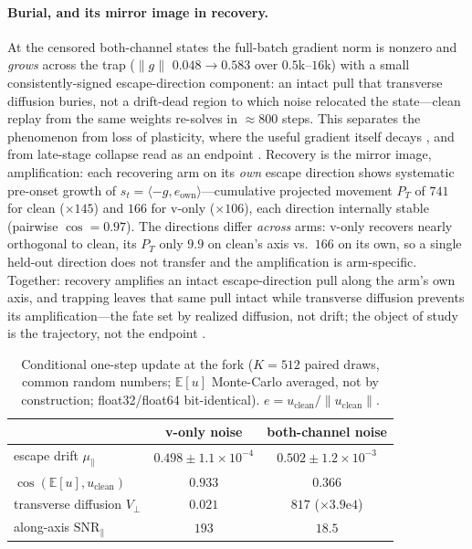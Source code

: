 \paragraph{Burial, and its mirror image in recovery.}
At the censored both-channel states the full-batch gradient norm is nonzero and
\emph{grows} across the trap ($\|g\|$ $0.048\!\to\!0.583$ over $0.5$k--$16$k) with
a small consistently-signed escape-direction component: an intact pull that
transverse diffusion buries, not a drift-dead region to which noise relocated the
state---clean replay from the same weights re-solves in ${\approx}800$ steps. This
separates the phenomenon from loss of plasticity, where the useful gradient itself
decays \citep{dohare}, and from late-stage collapse read as an endpoint
\citep{antigrok}. Recovery is the mirror image, amplification: each recovering arm
on its \emph{own} escape direction shows systematic pre-onset growth of
$s_t=\langle-g,e_{\mathrm{own}}\rangle$---cumulative projected movement $P_T$ of
$741$ for clean ($\times145$) and $166$ for v-only ($\times106$), each direction
internally stable (pairwise $\cos=0.97$). The directions differ \emph{across} arms:
v-only recovers nearly orthogonal to clean, its $P_T$ only $9.9$ on clean's axis
vs.\ $166$ on its own, so a single held-out direction does not transfer and the
amplification is arm-specific. Together: recovery amplifies an intact
escape-direction pull along the arm's own axis, and trapping leaves that same pull
intact while transverse diffusion prevents its amplification---the fate set by
realized diffusion, not drift; the object of study is the trajectory, not the
endpoint \citep{position}.

\begin{table}[t]
\centering\small
\caption{Conditional one-step update at the fork ($K{=}512$ paired draws, common
random numbers; $\mathbb{E}[u]$ Monte-Carlo averaged, not by construction;
float32/float64 bit-identical). $e=u_{\mathrm{clean}}/\|u_{\mathrm{clean}}\|$.}
\label{tab:drift}
\begin{tabular}{lcc}
\toprule
 & v-only noise & both-channel noise \\
\midrule
escape drift $\mu_\parallel$ & $0.498\pm1.1{\times}10^{-4}$ & $0.502\pm1.2{\times}10^{-3}$ \\
$\cos(\mathbb{E}[u],u_{\mathrm{clean}})$ & $0.933$ & $0.366$ \\
transverse diffusion $V_\perp$ & $0.021$ & $817$ \;($\times3.9\mathrm{e}4$) \\
along-axis $\mathrm{SNR}_\parallel$ & $193$ & $18.5$ \\
\bottomrule
\end{tabular}
\end{table}
